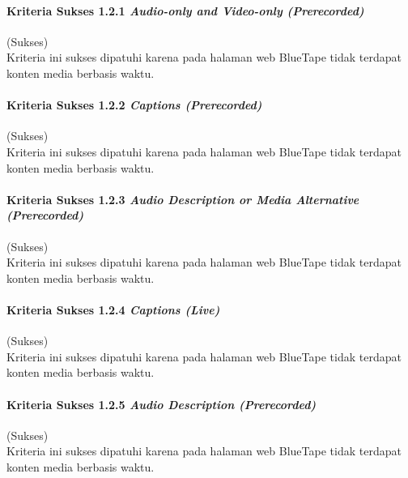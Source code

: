 \documentclass[a4paper,twoside]{article}
\begin{document}
\begin{enumerate}
		\paragraph{Kriteria Sukses 1.2.1 \textit{Audio-only and Video-only (Prerecorded)}}
		\label{par:kepatuhan_bluetape_kriteria_sukses_1.2.1}
		(Sukses)\\

		Kriteria ini sukses dipatuhi karena pada halaman web BlueTape tidak terdapat konten media berbasis waktu.

		\paragraph{Kriteria Sukses 1.2.2 \textit{Captions (Prerecorded)}}
		\label{par:kepatuhan_bluetape_kriteria_sukses_1.2.2}
		(Sukses)\\

		Kriteria ini sukses dipatuhi karena pada halaman web BlueTape tidak terdapat konten media berbasis waktu.

		\paragraph{Kriteria Sukses 1.2.3 \textit{Audio Description or Media Alternative (Prerecorded)}}
		\label{par:kepatuhan_bluetape_kriteria_sukses_1.2.3}
		(Sukses)\\

		Kriteria ini sukses dipatuhi karena pada halaman web BlueTape tidak terdapat konten media berbasis waktu.

		\paragraph{Kriteria Sukses 1.2.4 \textit{Captions (Live)}}
		\label{par:kepatuhan_bluetape_kriteria_sukses_1.2.4}
		(Sukses)\\

		Kriteria ini sukses dipatuhi karena pada halaman web BlueTape tidak terdapat konten media berbasis waktu.

		\paragraph{Kriteria Sukses 1.2.5 \textit{Audio Description (Prerecorded)}}
		\label{par:kepatuhan_bluetape_kriteria_sukses_1.2.5}
		(Sukses)\\

		Kriteria ini sukses dipatuhi karena pada halaman web BlueTape tidak terdapat konten media berbasis waktu.


\end{enumerate}
\end{document}
